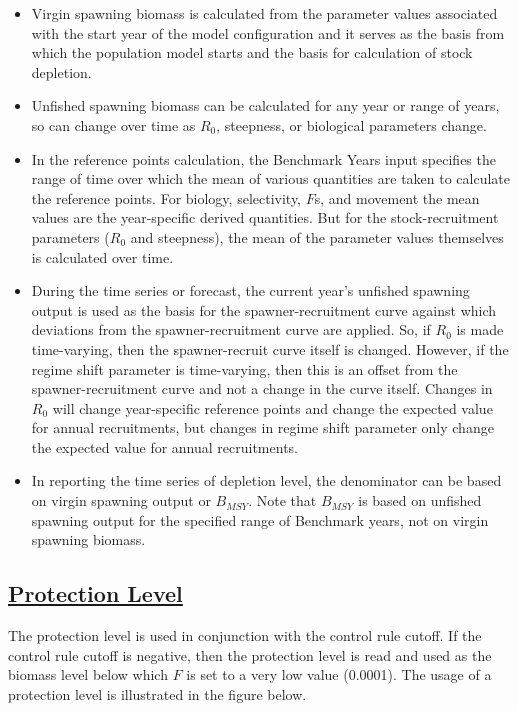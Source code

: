 \begin{itemize}
	\item Virgin spawning biomass is calculated from the parameter values associated with the start year of the model configuration and it serves as the basis from which the population model starts and the basis for calculation of stock depletion.
	
	\item Unfished spawning biomass can be calculated for any year or range of years, so can change over time as $R_{0}$, steepness, or biological parameters change.
	
	\item In the reference points calculation, the Benchmark Years input specifies the range of time over which the mean of various quantities are taken to calculate the reference points. For biology, selectivity, $F$s, and movement the mean values are the year-specific derived quantities. But for the stock-recruitment parameters ($R_{0}$ and steepness), the mean of the parameter values themselves is calculated over time.
	
	\item During the time series or forecast, the current year's unfished spawning output is used as the basis for the spawner-recruitment curve against which deviations from the spawner-recruitment curve are applied. So, if $R_{0}$ is made time-varying, then the spawner-recruit curve itself is changed. However, if the regime shift parameter is time-varying, then this is an offset from the spawner-recruitment curve and not a change in the curve itself. Changes in $R_{0}$ will change year-specific reference points and change the expected value for annual recruitments, but changes in regime shift parameter only change the expected value for annual recruitments.
	
	\item In reporting the time series of depletion level, the denominator can be based on virgin spawning output or $B_{MSY}$. Note that $B_{MSY}$ is based on unfished spawning output for the specified range of Benchmark years, not on virgin spawning biomass.
\end{itemize}

\hypertarget{ProtectionLevel}{}
\subsection[Protection Level]{\protect\hyperlink{ProtectionLevel}{Protection Level}}
The protection level is used in conjunction with the control rule cutoff. If the control rule cutoff is negative, then the protection level is read and used as the biomass level below which $F$ is set to a very low value (0.0001). The usage of a protection level is illustrated in the figure below. 

